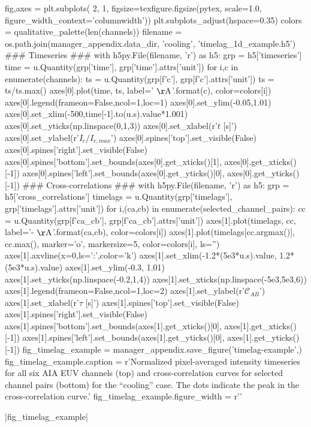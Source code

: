 \begin{pycode}
fig,axes = plt.subplots(
    2, 1, figsize=texfigure.figsize(pytex, scale=1.0,
                                    figure_width_context='columnwidth'))
plt.subplots_adjust(hspace=0.35)
colors = qualitative_palette(len(channels))
filename = os.path.join(manager_appendix.data_dir, 'cooling', 'timelag_1d_example.h5')
### Timeseries ###
with h5py.File(filename, 'r') as h5:
    grp = h5['timeseries']
    time = u.Quantity(grp['time'], grp['time'].attrs['unit'])
    for i,c in enumerate(channels):
        ts = u.Quantity(grp[f'{c}'], grp[f'{c}'].attrs['unit'])
        ts = ts/ts.max()
        axes[0].plot(time, ts, label='{} $\mathrm{{\AA}}$'.format(c),
                        color=colors[i])
axes[0].legend(frameon=False,ncol=1,loc=1)
axes[0].set_ylim(-0.05,1.01)
axes[0].set_xlim(-500,time[-1].to(u.s).value*1.001)
axes[0].set_yticks(np.linspace(0,1,3))
axes[0].set_xlabel(r'$t$ [s]')
axes[0].set_ylabel(r'$I_{c}/I_{c,max}$')
axes[0].spines['top'].set_visible(False)
axes[0].spines['right'].set_visible(False)
axes[0].spines['bottom'].set_bounds(axes[0].get_xticks()[1], axes[0].get_xticks()[-1])
axes[0].spines['left'].set_bounds(axes[0].get_yticks()[0], axes[0].get_yticks()[-1])
### Cross-correlations ###
with h5py.File(filename, 'r') as h5:
    grp = h5['cross_correlations']
    timelags = u.Quantity(grp['timelags'], grp['timelags'].attrs['unit'])
    for i,(ca,cb) in enumerate(selected_channel_pairs):
        cc = u.Quantity(grp[f'{ca}_{cb}'], grp[f'{ca}_{cb}'].attrs['unit'])
        axes[1].plot(timelags, cc, label='{}-{} $\mathrm{{\AA}}$'.format(ca,cb),
                        color=colors[i])
        axes[1].plot(timelags[cc.argmax()], cc.max(), marker='o', markersize=5,
                        color=colors[i], ls='')
axes[1].axvline(x=0,ls=':',color='k')
axes[1].set_xlim(-1.2*(5e3*u.s).value, 1.2*(5e3*u.s).value)
axes[1].set_ylim(-0.3, 1.01)
axes[1].set_yticks(np.linspace(-0.2,1,4))
axes[1].set_xticks(np.linspace(-5e3,5e3,6))
axes[1].legend(frameon=False,ncol=1,loc=2)
axes[1].set_ylabel(r'$\mathcal{C}_{AB}$')
axes[1].set_xlabel(r'$\tau$ [s]')
axes[1].spines['top'].set_visible(False)
axes[1].spines['right'].set_visible(False)
axes[1].spines['bottom'].set_bounds(axes[1].get_xticks()[0], axes[1].get_xticks()[-1])
axes[1].spines['left'].set_bounds(axes[1].get_yticks()[0], axes[1].get_yticks()[-1])
fig_timelag_example = manager_appendix.save_figure('timelag-example',)
fig_timelag_example.caption = r'Normalized pixel-averaged intensity timeseries for all six AIA EUV channels (top) and cross-correlation curves for selected channel pairs (bottom) for the ``cooling'' case. The dots indicate the peak in the cross-correlation curve.'
fig_timelag_example.figure_width = r'\columnwidth'
\end{pycode}
|fig_timelag_example|
    

